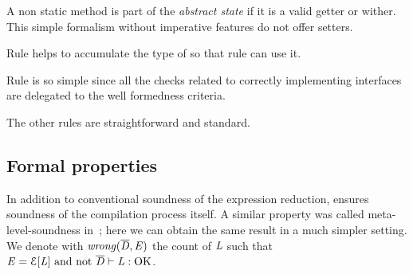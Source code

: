 \noindent A non static method is part of the \emph{abstract state} if 
it is a valid getter or wither. This simple formalism without imperative features do not offer setters.


Rule  helps to accumulate the type of \Q@this@ so that rule 
can use it.

Rule  is so simple since all the checks
related to correctly implementing interfaces are delegated to the well formedness criteria.

The other rules are straightforward and standard.

\subsection{Formal properties}
In addition to conventional soundness of the expression reduction,
\name ensures soundness of the compilation process itself.
A similar property was called meta-level-soundness in~\cite{servetto2014meta}; here we can obtain the same result in
a much simpler setting.
We denote with $\mathit{wrong}(\overline{\mathit{D}},\mathit{E})$ the count of $\mathit{L}$ such that
$\mE=\ctx[\mL]\ \text{and not}\ \overline\mD\vdash\mL:\text{OK}$.

